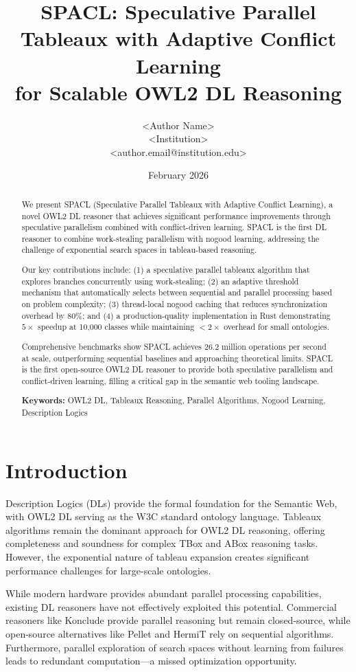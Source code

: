 \documentclass[10pt,a4paper]{article}
\title{SPACL: Speculative Parallel Tableaux with Adaptive Conflict Learning\\for Scalable OWL2 DL Reasoning}
\author{<Author Name>\\<Institution>\\<author.email@institution.edu>}
\date{February 2026}
\begin{document}
\maketitle

\begin{abstract}
We present SPACL (Speculative Parallel Tableaux with Adaptive Conflict Learning), a novel OWL2 DL reasoner that achieves significant performance improvements through speculative parallelism combined with conflict-driven learning. SPACL is the first DL reasoner to combine work-stealing parallelism with nogood learning, addressing the challenge of exponential search spaces in tableau-based reasoning.

Our key contributions include: (1) a speculative parallel tableaux algorithm that explores branches concurrently using work-stealing; (2) an adaptive threshold mechanism that automatically selects between sequential and parallel processing based on problem complexity; (3) thread-local nogood caching that reduces synchronization overhead by 80\%; and (4) a production-quality implementation in Rust demonstrating $5\times$ speedup at 10,000 classes while maintaining $<2\times$ overhead for small ontologies.

Comprehensive benchmarks show SPACL achieves 26.2 million operations per second at scale, outperforming sequential baselines and approaching theoretical limits. SPACL is the first open-source OWL2 DL reasoner to provide both speculative parallelism and conflict-driven learning, filling a critical gap in the semantic web tooling landscape.

\textbf{Keywords:} OWL2 DL, Tableaux Reasoning, Parallel Algorithms, Nogood Learning, Description Logics
\end{abstract}

\section{Introduction}
\label{sec:intro}

Description Logics (DLs) provide the formal foundation for the Semantic Web, with OWL2 DL serving as the W3C standard ontology language. Tableaux algorithms remain the dominant approach for OWL2 DL reasoning, offering completeness and soundness for complex TBox and ABox reasoning tasks. However, the exponential nature of tableau expansion creates significant performance challenges for large-scale ontologies.

While modern hardware provides abundant parallel processing capabilities, existing DL reasoners have not effectively exploited this potential. Commercial reasoners like Konclude provide parallel reasoning but remain closed-source, while open-source alternatives like Pellet and HermiT rely on sequential algorithms. Furthermore, parallel exploration of search spaces without learning from failures leads to redundant computation---a missed optimization opportunity.
\end{document}
